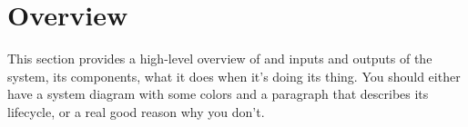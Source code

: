 \section{Overview}\label{sec:overview}

This section provides a high-level overview of and inputs and outputs of the system, its components, what it does when it's doing its thing.
You should either have a system diagram with some colors and a paragraph that describes its lifecycle, or a real good reason why you don't.
